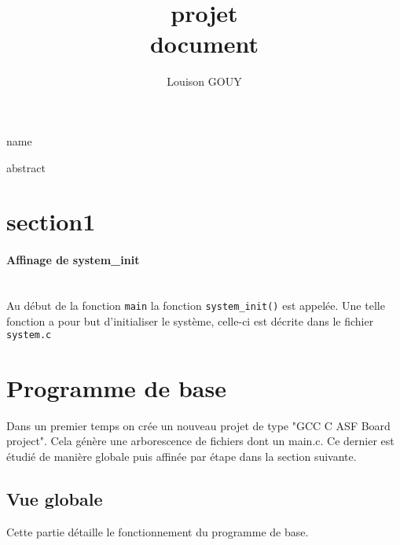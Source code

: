 \documentclass[a4paper]{article}
\title{\textbf{projet} \\ document}
\author{Louison GOUY}
\begin{document}
\maketitle

\vspace{2cm}

\begin{center}
\end{center}

\vspace*{1cm}

\begin{center}
    name
\end{center}

\vspace*{7cm}

\begin{center}

abstract

\end{center}
\newpage
\renewcommand{\contentsname}{Table des Matières}
\tableofcontents
\newpage
\renewcommand\listfigurename{Liste des figures}
\listoffigures
\newpage

\section{section1}

\paragraph{Affinage de system\_init}
~~\\

\noindent Au début de la fonction \texttt{main} la fonction \texttt{system\_init()} est appelée. Une telle fonction a pour but d'initialiser le système, celle-ci est décrite dans le fichier \texttt{system.c}



\section{Programme de base} %

Dans un premier temps on crée un nouveau projet de type "GCC C ASF Board project". Cela génère une arborescence de fichiers dont un main.c. Ce dernier est étudié de manière globale puis affinée par étape dans la section suivante.

\subsection{Vue globale}
Cette partie détaille le fonctionnement du programme de base. 
\end{document}
